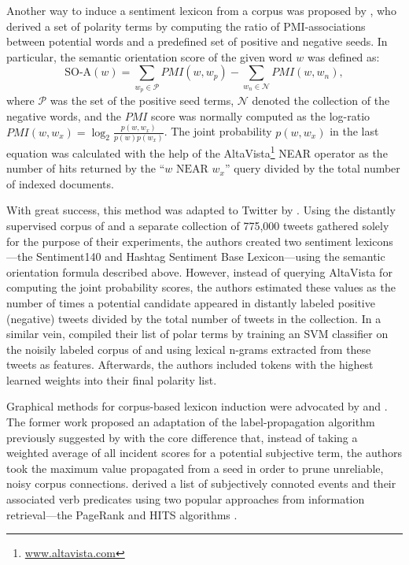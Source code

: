 Another way to induce a sentiment lexicon from a corpus was proposed
by \citet{Turney:03}, who derived a set of polarity terms by computing
the ratio of PMI-associations between potential words and a predefined
set of positive and negative seeds.  In particular, the semantic
orientation score of the given word $w$ was defined as:
\begin{equation*}
  \textrm{SO-A}(w) = \sum_{w_p\in\mathcal{P}}PMI(w, w_p) - \sum_{w_n\in\mathcal{N}}PMI(w, w_n),
\end{equation*}
where $\mathcal{P}$ was the set of the positive seed terms,
$\mathcal{N}$ denoted the collection of the negative words, and the
$PMI$ score was normally computed as the log-ratio $PMI(w, w_x) =
\log_2\frac{p(w, w_x)}{p(w)p(w_x)}$.  The joint probability $p(w,
w_x)$ in the last equation was calculated with the help of the
AltaVista\footnote{\url{www.altavista.com}} NEAR operator as the
number of hits returned by the ``$w\textrm{ NEAR }w_x$'' query divided
by the total number of indexed documents.

With great success, this method was adapted to Twitter by
\citet{Kiritchenko:14}.  Using the distantly supervised corpus of
\citet{Go:09} and a separate collection of 775,000 tweets gathered
solely for the purpose of their experiments, the authors created two
sentiment lexicons---the Sentiment140 and Hashtag Sentiment Base
Lexicon---using the semantic orientation formula described above.
However, instead of querying AltaVista for computing the joint
probability scores, the authors estimated these values as the number
of times a potential candidate appeared in distantly labeled positive
(negative) tweets divided by the total number of tweets in the
collection.  In a similar vein, \citet{Severyn:15a} compiled their
list of polar terms by training an SVM classifier on the noisily
labeled corpus of \citet{Go:09} and using lexical n-grams extracted
from these tweets as features.  Afterwards, the authors included
tokens with the highest learned weights into their final polarity
list.

Graphical methods for corpus-based lexicon induction were advocated by
\citet{Velikovich:10} and \citet{Feng:11}.  The former work proposed
an adaptation of the label-propagation algorithm previously suggested
by \citet{Rao:09} with the core difference that, instead of taking a
weighted average of all incident scores for a potential subjective
term, the authors took the maximum value propagated from a seed in
order to prune unreliable, noisy corpus connections.  \citet{Feng:11}
derived a list of subjectively connoted events and their associated
verb predicates using two popular approaches from information
retrieval---the PageRank \cite{Brin:98} and HITS algorithms
\cite{Kleinberg:99}.

